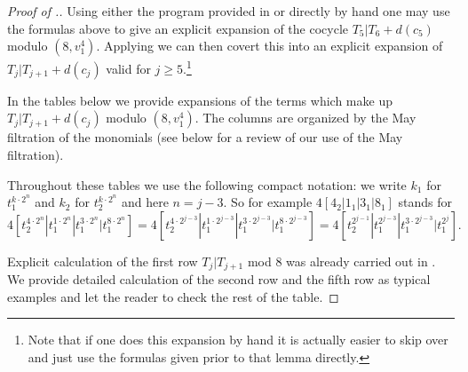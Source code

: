 \begin{proof}[Proof of .]
  Using either the program provided in  or directly by hand one may use the formulas above to give an explicit expansion of the cocycle $T_5|T_{6} + d(c_5)$ modulo $(8,v_1^4)$. Applying  we can then covert this into an explicit expansion of $T_j|T_{j+1} + d(c_j)$ valid for $j \geq 5$.\footnote{Note that if one does this expansion by hand it is actually easier to skip over  and just use the formulas given prior to that lemma directly.}

  In the tables below we provide expansions of the terms which make up $T_j|T_{j+1} + d(c_j)$ modulo $(8,v_1^4)$.
  The columns are organized by the May filtration of the monomials (see below for a review of our use of the May filtration).
  
  Throughout these tables we use the following compact notation:
  we write $k_1$ for $t_1^{k \cdot 2^n}$ and $k_2$ for $t_2^{k \cdot 2^n}$ and here $n=j-3$. So for example $4[4_2|1_1|3_1|8_1]$ stands for 
  $$4[t_2^{4\cdot 2^n}|t_1^{1\cdot 2^n}|t_1^{3\cdot 2^n}|t_1^{8\cdot 2^n}] = 4[t_2^{4\cdot 2^{j-3}}|t_1^{1\cdot 2^{j-3}}|t_1^{3\cdot 2^{j-3}}|t_1^{8\cdot 2^{j-3}}] = 4[t_2^{2^{j-1}}|t_1^{2^{j-3}}|t_1^{3\cdot 2^{j-3}}|t_1^{2^{j}}] .$$

  
  Explicit calculation of the first row $T_j|T_{j+1}$ mod 8 was already carried out in .
  We provide detailed calculation of the second row and the fifth row as typical examples and let the reader to check the rest of the table. 
 

\end{proof}
